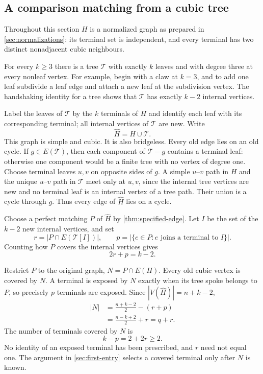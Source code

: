\documentclass[a4paper,11pt]{article}
\newcommand{\abs}[1]{\left\lvert#1\right\rvert}
\numberwithin{equation}{section}
\begin{document}
\subsection{A comparison matching from a cubic tree}\label{sec:cubic-tree}

Throughout this section $H$ is a normalized graph as prepared in
\cref{sec:normalizations}: its terminal set is independent, and every terminal
has two distinct nonadjacent cubic neighbours.

For every $k\ge 3$ there is a tree $\mathcal T$ with exactly $k$ leaves and with
degree three at every nonleaf vertex. For example, begin with a claw at $k=3$,
and to add one leaf subdivide a leaf edge and attach a new leaf at the
subdivision vertex. The handshaking identity for a tree shows that $\mathcal T$
has exactly $k-2$ internal vertices.

Label the leaves of $\mathcal T$ by the $k$ terminals of $H$ and identify each
leaf with its corresponding terminal; all internal vertices of $\mathcal T$ are
new. Write
\[
  \widehat H=H\cup\mathcal T .
\]
This graph is simple and cubic. It is also bridgeless. Every old edge lies on an
old cycle. If $g\in E(\mathcal T)$, then each component of $\mathcal T-g$
contains a terminal leaf: otherwise one component would be a finite tree with no
vertex of degree one. Choose terminal leaves $u,v$ on opposite sides of $g$. A
simple $u$--$v$ path in $H$ and the unique $u$--$v$ path in $\mathcal T$ meet
only at $u,v$, since the internal tree vertices are new and no terminal leaf is
an internal vertex of a tree path. Their union is a cycle through $g$. Thus
every edge of $\widehat H$ lies on a cycle.

Choose a perfect matching $P$ of $\widehat H$ by \cref{thm:specified-edge}. Let
$I$ be the set of the $k-2$ new internal vertices, and set
\[
  r=\abs{P\cap E(\mathcal T[I])},
  \qquad
  p=\abs{\{e\in P:e\text{ joins a terminal to }I\}} .
\]
Counting how $P$ covers the internal vertices gives
\[
  2r+p=k-2 .
\]

Restrict $P$ to the original graph, $N=P\cap E(H)$. Every old cubic vertex is
covered by $N$. A terminal is exposed by $N$ exactly when its tree spoke belongs
to $P$, so precisely $p$ terminals are exposed. Since
$\abs{V(\widehat H)}=n+k-2$,
\begin{equation}\label{eq:N-size}
  \begin{aligned}
    \abs{N}
      &=\frac{n+k-2}{2}-(r+p)\\
      &=\frac{n-k+2}{2}+r=q+r .
  \end{aligned}
\end{equation}
The number of terminals covered by $N$ is
\begin{equation}\label{eq:covered-terminals}
  k-p=2+2r\ge 2 .
\end{equation}
No identity of an exposed terminal has been prescribed, and $r$ need not equal
one. The argument in \cref{sec:first-entry} selects a covered terminal only
after $N$ is known.
\end{document}
